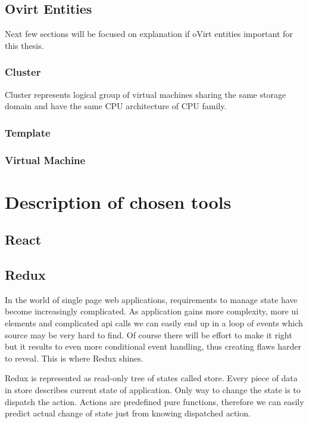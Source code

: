 \section{Ovirt Entities}
Next few sections will be focused on explanation if oVirt entities important for this thesis.

\subsection{Cluster}
Cluster represents logical group of virtual machines sharing the same storage domain and have the same CPU architecture of CPU family.

\subsection{Template}


\subsection{Virtual Machine}

\chapter{Description of chosen tools}

\section{React}
\section{Redux}
In the world of single page web applications, requirements to manage state have become increasingly complicated. As application gains more complexity, more ui elements and complicated api calls we can easily end up in a loop of events which source may be very hard to find. Of course there will be effort to make it right but it results to even more conditional event handling, thus creating flaws harder to reveal. This is where Redux shines.

Redux is represented as read-only tree of states called store. Every piece of data in store describes current state of application. Only way to change the state is to dispatch the action. Actions are predefined pure functions, therefore we can easily predict actual change of state just from knowing dispatched action.

